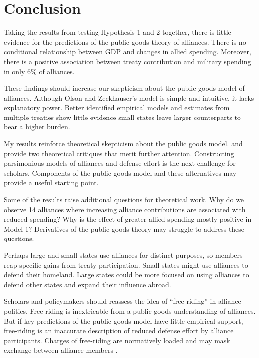 \documentclass[12pt]{article}
\begin{document}
\section{Conclusion}

Taking the results from testing Hypothesis 1 and 2 together, there is little evidence for the predictions of the public goods theory of alliances. 
There is no conditional relationship between GDP and changes in allied spending.
Moreover, there is a positive association between treaty contribution and military spending in only 6\% of alliances. 


These findings should increase our skepticism about the public goods model of alliances. 
Although Olson and Zeckhauser's model is simple and intuitive, it lacks explanatory power. 
Better identified empirical models and estimates from multiple treaties show little evidence small states leave larger counterparts to bear a higher burden. 


My results reinforce theoretical skepticism about the public goods model. 
\citet{Palmer1990} and \citet{SandlerHartley2001} provide two theoretical critiques that merit further attention. 
Constructing parsimonious models of alliances and defense effort is the next challenge for scholars. 
Components of the public goods model and these alternatives may provide a useful starting point. 


Some of the results raise additional questions for theoretical work. 
Why do we observe 14 alliances where increasing alliance contributions are associated with reduced spending?
Why is the effect of greater allied spending mostly positive in Model 1? 
Derivatives of the public goods theory may struggle to address these questions. 


Perhaps large and small states use alliances for distinct purposes, so members reap specific gains from treaty participation. 
Small states might use alliances to defend their homeland. 
Large states could be more focused on using alliances to defend other states and expand their influence abroad. 


Scholars and policymakers should reassess the idea of ``free-riding'' in alliance politics. 
Free-riding is inextricable from a public goods understanding of alliances.
But if key predictions of the public goods model have little empirical support, free-riding is an inaccurate description of reduced defense effort by alliance participants.  
Charges of free-riding are normatively loaded and may mask exchange between alliance members \citep{Lanoszka2015}. 
\end{document}
